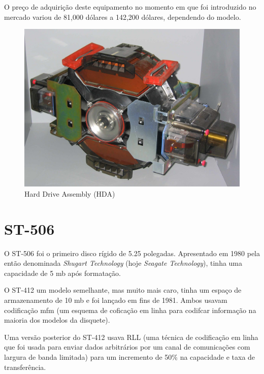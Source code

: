 \documentclass{report}
\begin{document}
	O preço de adquirição deste equipamento no momento em que foi introduzido no mercado variou de 81,000 dólares a 142,200 dólares, dependendo do modelo.
\vspace{1mm}

	\begin{figure} [h]
		\centering
		\includegraphics[scale=0.07]{ibm3380.jpg}
		\caption{Hard Drive Assembly (HDA)}
	\end{figure}

\newpage
		
		\section{ST-506}

	O ST-506 foi o primeiro disco rígido de 5.25 polegadas. Apresentado em 1980 pela então denominada \textit{Shugart Technology} (hoje \textit{Seagate Technology}), tinha uma capacidade de 5 \ac{mb} após formatação. 
\vspace{1mm}

	O ST-412 um modelo semelhante, mas muito mais caro, tinha um espaço de armazenamento de 10 \ac{mb} e foi lançado em fins de 1981. Ambos usavam codificação \ac{mfm} (um esquema de coficação em linha para codifcar informação na maioria dos modelos da disquete).
\vspace{1mm}
	
	Uma versão posterior do ST-412 usava RLL (uma técnica de codificação em linha que foi usada para enviar dados arbitrários por um canal de comunicações com largura de banda limitada) para um incremento de 50\% na capacidade e taxa de transferência.
\vspace{1mm}
	
\end{document}
